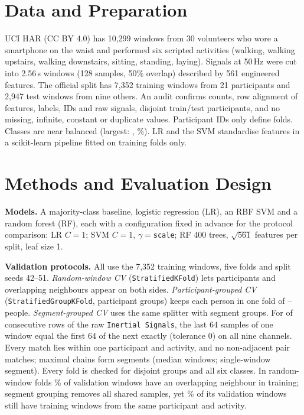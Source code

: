 \documentclass{article}
\begin{document}
\section{Data and Preparation}
UCI HAR \citep{anguita2013,uci_har} (CC BY 4.0) has 10,299 windows from 30 volunteers who wore a smartphone on the waist and performed six scripted activities (walking, walking upstairs, walking downstairs, sitting, standing, laying). Signals at 50\,Hz were cut into 2.56\,s windows (128 samples, 50\% overlap) described by 561 engineered features. The official split has 7,352 training windows from 21 participants and 2,947 test windows from nine others. An audit confirms counts, row alignment of features, labels, IDs and raw signals, disjoint train/test participants, and no missing, infinite, constant or duplicate values. Participant IDs only define folds. Classes are near balanced (largest: \Nmajlabel, \Nmajshare\%). LR and the SVM standardise features in a scikit-learn pipeline \citep{sklearn} fitted on training folds only.

\section{Methods and Evaluation Design}
\textbf{Models.} A majority-class baseline, logistic regression (LR), an RBF SVM and a random forest (RF), each with a configuration fixed in advance for the protocol comparison: LR $C{=}1$; SVM $C{=}1$, $\gamma{=}$\texttt{scale}; RF 400 trees, $\sqrt{561}$ features per split, leaf size 1.

\textbf{Validation protocols.} All use the 7,352 training windows, five folds and split seeds 42--51. \emph{Random-window CV} (\texttt{StratifiedKFold}) lets participants and overlapping neighbours appear on both sides. \emph{Participant-grouped CV} (\texttt{StratifiedGroupKFold}, participant groups) keeps each person in one fold of \Ngrpvalsubjmin--\Ngrpvalsubjmax{} people. \emph{Segment-grouped CV} uses the same splitter with segment groups. For \Nnlinks{} of \Nnpairs{} consecutive rows of the raw \texttt{Inertial Signals}, the last 64 samples of one window equal the first 64 of the next exactly (tolerance 0) on all nine channels. Every match lies within one participant and activity, and no non-adjacent pair matches; maximal chains form \Nnseg{} segments (median \Nseglenmed{} windows; \Nnsingleseg{} single-window segment). Every fold is checked for disjoint groups and all six classes. In random-window folds \NoverlapR\% of validation windows have an overlapping neighbour in training; segment grouping removes all shared samples, yet \NsaS\% of its validation windows still have training windows from the same participant and activity.
\end{document}
